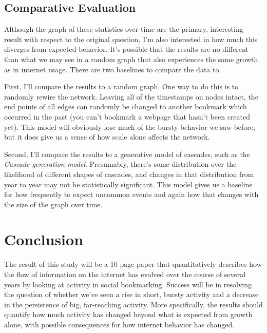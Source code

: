 \documentclass[12pt]{amsart}
\begin{document}
\subsection{Comparative Evaluation}
Although the graph of these statistics over time are the primary, interesting result with respect to the original question, I'm also interested in how much this diverges from expected behavior. It's possible that the results are no different than what we may see in a random graph that also experiences the same growth as in internet usage. There are two baselines to compare the data to.

First, I'll compare the results to a random graph. One way to do this is to randomly rewire the network\cite{bursty}. Leaving all of the timestamps on nodes intact, the end points of all edges can randomly be changed to another bookmark which occurred in the past (you can't bookmark a webpage that hasn't been created yet). This model will obviously lose much of the bursty behavior we saw before, but it does give us a sense of how scale alone affects the network.

Second, I'll compare the results to a generative model of cascades, such as the \textit{Cascade generation model}\cite{cascade}. Presumably, there's some distribution over the likelihood of different shapes of cascades, and changes in that distribution from year to year may not be statistically significant. This model gives us a baseline for how frequently to expect uncommon events and again how that changes with the size of the graph over time.

\section{Conclusion}
The result of this study will be a 10 page paper that quantitatively describes how the flow of information on the internet has evolved over the course of several years by looking at activity in social bookmarking. Success will be in resolving the question of whether we've seen a rise in short, bursty activity and a decrease in the persistence of big, far-reaching activity. More specifically, the results should quantify how much activity has changed beyond what is expected from growth alone, with possible consequences for how internet behavior has changed.



\end{document}
